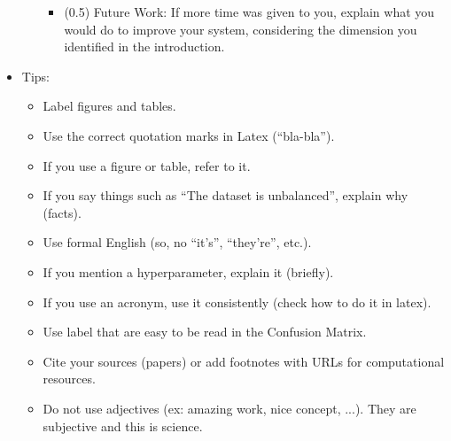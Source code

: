 \documentclass[twocolumn,10pt]{article}
\begin{document}
\begin{itemize}
\begin{itemize}
\begin{itemize}
\item (0.5) Future Work: If more time was given to you, explain what you would do to improve your system, considering the dimension you identified in the introduction.
\end{itemize}
\end{itemize}
\item Tips:
\begin{itemize}
\item Label figures and tables.
\item Use the correct quotation marks in Latex (``bla-bla'').
\item If you use a figure or table, refer to it.
\item If you say things such as ``The dataset is unbalanced'', explain why (facts).
\item Use formal English (so, no ``it's'', ``they're'', etc.).
\item If you mention a hyperparameter, explain it (briefly).
\item If you use an acronym, use it consistently (check how to do it in latex).
\item Use label that are easy to be read in the Confusion Matrix.
\item Cite your sources (papers) or add footnotes with URLs for computational resources.
\item Do not use adjectives (ex: amazing work, nice concept, ...). They are subjective and this is science.
\end{itemize}
\end{itemize}
 
\end{document}
